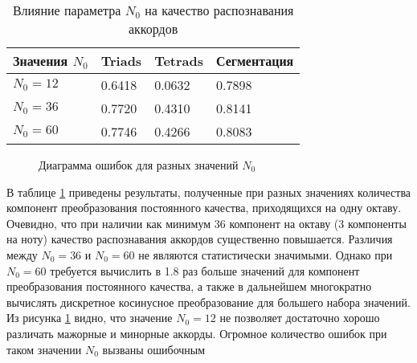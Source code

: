 \begin{table} [htbp]
  \centering
  \parbox{15cm}{\caption{Влияние параметра $N_0$ на качество распознавания
  аккордов} \label{TN0}}
  \begin{tabular}{|l|l|l|l|}
  \hline
  Значения $N_0$ & Triads & Tetrads & Сегментация \\
  \hline
  $N_0 = 12$ & 0.6418 & 0.0632 & 0.7898 \\
  $N_0 = 36$ & 0.7720 & 0.4310 & 0.8141 \\
  $N_0 = 60$ & 0.7746 & 0.4266 & 0.8083 \\
  \hline
  \end{tabular}
\end{table}

\begin{figure}[h]
  \begin{minipage}[h]{0.49\linewidth}
  \end{minipage}
  \hfill
  \begin{minipage}[h]{0.49\linewidth}
  \end{minipage}
  \hfill
  \begin{minipage}[h]{0.49\linewidth}
  \end{minipage}
  \hfill
  \begin{minipage}[h]{0.49\linewidth}
  \end{minipage}
  \caption{Диаграмма ошибок для разных значений $N_0$}
  \label{img:n0}
\end{figure}

В таблице \ref{TN0} приведены результаты, полученные при разных значениях
количества компонент преобразования постоянного качества, приходящихся на одну
октаву. Очевидно, что при наличии как минимум 36 компонент на октаву (3
компоненты на ноту) качество распознавания аккордов существенно повышается.
Различия между $N_0=36$ и $N_0=60$ не являются статистически значимыми. Однако
при $N_0=60$ требуется вычислить в 1.8 раз больше значений для компонент
преобразования постоянного качества, а также в дальнейшем многократно вычислять
дискретное косинусное преобразование для большего набора значений. Из рисунка
\ref{img:n0} видно, что значение $N_0=12$ не позволяет достаточно хорошо
различать мажорные и минорные аккорды. Огромное количество ошибок при таком
значении $N_0$ вызваны ошибочным 

